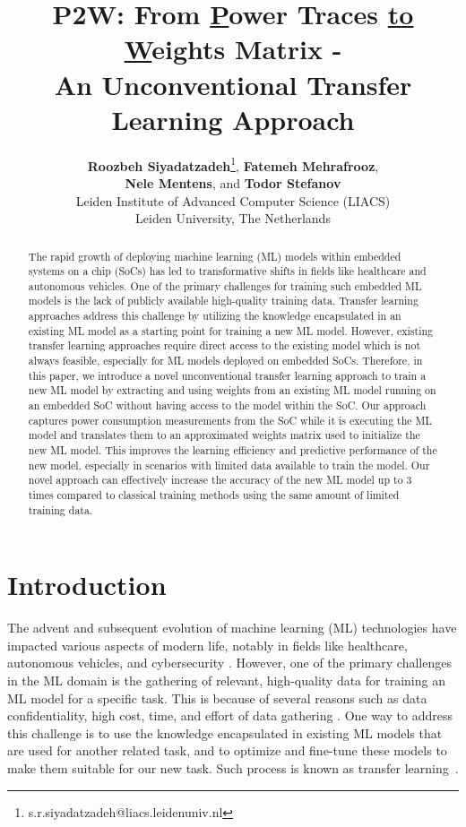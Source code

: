 \documentclass[letterpaper]{article}
\title{P2W: From \underline{P}ower Traces \underline{to} \underline{W}eights Matrix - \\ An Unconventional Transfer Learning Approach}
\author{
    \textbf{Roozbeh Siyadatzadeh}\thanks{s.r.siyadatzadeh@liacs.leidenuniv.nl}, \textbf{Fatemeh Mehrafrooz},\\
    \textbf{Nele Mentens}, and \textbf{Todor Stefanov} \\
    Leiden Institute of Advanced Computer Science (LIACS) \\
    Leiden University, The Netherlands
}
\date{}
\begin{document}
\maketitle


\begin{abstract}
The rapid growth of deploying machine learning (ML) models within embedded systems on a chip (SoCs) has led to transformative shifts in fields like healthcare and autonomous vehicles. One of the primary challenges for training such embedded ML models is the lack of publicly available high-quality training data. Transfer learning approaches address this challenge by utilizing the knowledge encapsulated in an existing ML model as a starting point for training a new ML model. However, existing transfer learning approaches require direct access to the existing model which is not always feasible, especially for ML models deployed on embedded SoCs. Therefore, in this paper, we introduce a novel unconventional transfer learning approach to train a new ML model by extracting and using weights from an existing ML model running on an embedded SoC without having access to the model within the SoC. Our approach captures power consumption measurements from the SoC while it is executing the ML model and translates them to an approximated weights matrix used to initialize the new ML model. This improves the learning efficiency and predictive performance of the new model, especially in scenarios with limited data available to train the model. Our novel approach can effectively increase the accuracy of the new ML model up to 3 times compared to classical training methods using the same amount of limited training data.
\end{abstract}


\section{Introduction}
The advent and subsequent evolution of machine learning (ML) technologies have impacted various aspects of modern life, notably in fields like healthcare, autonomous vehicles, and cybersecurity \cite{Sarker2023}. However, one of the primary challenges in the ML domain is the gathering of relevant, high-quality data for training an ML model for a specific task. This is because of several reasons such as data confidentiality, high cost, time, and effort of data gathering \cite{10.1007/978-3-030-01364-6_17}. One way to address this challenge is to use the knowledge encapsulated in existing ML models that are used for another related task, and to optimize and fine-tune these models to make them suitable for our new task. Such process is known as transfer learning~\cite{10172347}.
\end{document}
